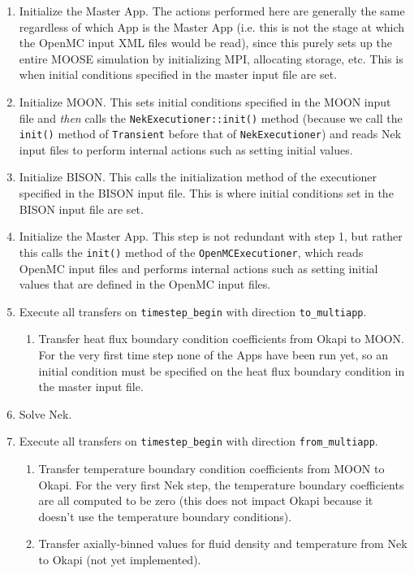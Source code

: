 \documentclass[10pt]{article}
\numberwithin{equation}{section} %
\begin{document}
\begin{enumerate}
\item Initialize the Master App. The actions performed here are generally the same regardless of which App is the Master App (i.e. this is not the stage at which the OpenMC input XML files would be read), since this purely sets up the entire MOOSE simulation by initializing MPI, allocating storage, etc. This is when initial conditions specified in the master input file are set.
\item Initialize MOON. This sets initial conditions specified in the MOON input file and {\it then} calls the {\tt NekExecutioner::init()} method (because we call the {\tt init()} method of {\tt Transient} before that of {\tt NekExecutioner}) and reads Nek input files to perform internal actions such as setting initial values.
\item Initialize BISON. This calls the initialization method of the executioner specified in the BISON input file. This is where initial conditions set in the BISON input file are set.
%
\item Initialize the Master App. This step is not redundant with step 1, but rather this calls the {\tt init()} method of the {\tt OpenMCExecutioner}, which reads OpenMC input files and performs internal actions such as setting initial values that are defined in the OpenMC input files.
%
\item Execute all transfers on {\tt timestep\_begin} with direction {\tt to\_multiapp}.
	\begin{enumerate}
	\item Transfer heat flux boundary condition coefficients from Okapi to MOON. For the very first time step none of the Apps have been run yet, so an initial condition must be specified on the heat flux boundary condition in the master input file.
	\end{enumerate}
\item Solve Nek.
\item Execute all transfers on {\tt timestep\_begin} with direction {\tt from\_multiapp}.
	\begin{enumerate}
	\item Transfer temperature boundary condition coefficients from MOON to Okapi. For the very first Nek step, the temperature boundary coefficients are all computed to be zero (this does not impact Okapi because it doesn't use the temperature boundary conditions).
	\item Transfer axially-binned values for fluid density and temperature from Nek to Okapi (not yet implemented).

\end{enumerate}
\end{enumerate}
\end{document}
